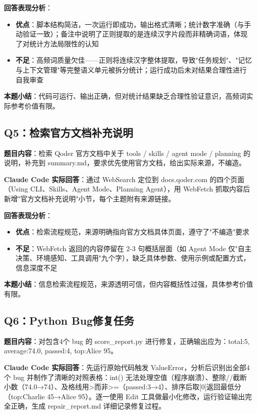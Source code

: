 \documentclass[a4paper]{article}
\begin{document}
\textbf{回答表现分析}：

\begin{itemize}
    \item \textbf{优点}：脚本结构简洁，一次运行即成功，输出格式清晰；统计数字准确（与手动验证一致）；备注中说明了正则提取的是连续汉字片段而非精确词语，体现了对统计方法局限性的认知
    \item \textbf{不足}：高频词质量欠佳——正则将连续汉字整体提取，导致"任务规划"、"记忆与上下文管理"等完整语义单元被拆分统计；运行成功后未对结果合理性进行自我审查
\end{itemize}

\textbf{本题小结}：代码可运行、输出正确，但对统计结果缺乏合理性验证意识，高频词实际参考价值有限。

\subsection*{Q5：检索官方文档补充说明}

\textbf{题目内容}：检索 Qoder 官方文档中关于 tools / skills / agent mode / planning 的说明，补充到 summary.md，要求优先使用官方文档，给出实际来源，不编造。

\textbf{Claude Code 实际回答}：通过 WebSearch 定位到 docs.qoder.com 的四个页面（Using CLI、Skills、Agent Mode、Planning Agent），用 WebFetch 抓取内容后新增"官方文档补充说明"小节，每个主题附有来源链接。

\textbf{回答表现分析}：

\begin{itemize}
    \item \textbf{优点}：检索流程规范，来源明确指向官方文档具体页面，遵守了"不编造"要求
    \item \textbf{不足}：WebFetch 返回的内容停留在 2-3 句概括层面（如 Agent Mode 仅"自主决策、环境感知、工具调用"九个字），缺乏具体参数、使用示例或配置方式，信息深度不足
\end{itemize}

\textbf{本题小结}：信息检索流程规范，来源透明可信，但内容概括性过强，具体参考价值有限。

\subsection*{Q6：Python Bug修复任务}

\textbf{题目内容}：对包含4个 bug 的 score\_report.py 进行修复，正确输出应为：total:5, average:74.0, passed:4, top:Alice 95。

\textbf{Claude Code 实际回答}：先运行原始代码触发 ValueError，分析后识别出全部4个 bug 并制作了清晰的对照表格：int() 无法处理空值（程序崩溃）、整除//截断小数（74.0→74）、及格线用>而非>=（passed:3→4）、排序后取[0]返回最低分（top:Charlie 45→Alice 95）。逐一使用 Edit 工具做最小化修改，运行验证输出完全正确，生成 repair\_report.md 详细记录修复过程。
\end{document}
